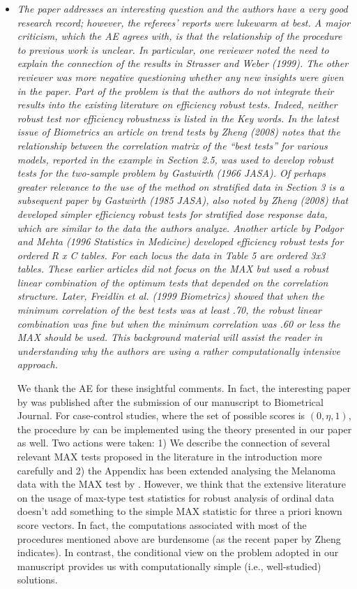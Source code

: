 \documentclass{article}
\begin{document}
\begin{itemize}
\item 
\textit{
The paper addresses an interesting question and the authors have a very good
research record; however, the referees’ reports were lukewarm at best. A major criticism,
which the AE agrees with, is that the relationship of the procedure to previous work is
unclear. In particular, one reviewer noted the need to explain the connection of the results
in Strasser and Weber (1999). The other reviewer was more negative questioning whether
any new insights were given in the paper. Part of the problem is that the authors do not
integrate their results into the existing literature on efficiency robust tests. Indeed, neither
robust test nor efficiency robustness is listed in the Key words. In the latest issue of
Biometrics an article on trend tests by Zheng (2008) notes that the relationship between
the correlation matrix of the “best tests” for various models, reported in the example in
Section 2.5, was used to develop robust tests for the two-sample problem by Gastwirth
(1966 JASA). Of perhaps greater relevance to the use of the method on stratified data in
Section 3 is a subsequent paper by Gastwirth (1985 JASA), also noted by Zheng (2008)
that developed simpler efficiency robust tests for stratified dose response data, which are
similar to the data the authors analyze. Another article by Podgor and Mehta (1996
Statistics in Medicine) developed efficiency robust tests for ordered R x C tables. For
each locus the data in Table 5 are ordered 3x3 tables. These earlier articles did not focus
on the MAX but used a robust linear combination of the optimum tests that depended on
the correlation structure. Later, Freidlin et al. (1999 Biometrics) showed that when the
minimum correlation of the best tests was at least .70, the robust linear combination was
fine but when the minimum correlation was .60 or less the MAX should be used. This
background material will assist the reader in understanding why the authors are using a
rather computationally intensive approach.}

We thank the AE for these insightful comments. In fact, the interesting
paper by \cite{Zheng:2008} was published after the submission of our manuscript
to Biometrical Journal. For case-control studies, where the set of
possible scores is $(0, \eta, 1)$, the procedure by
\cite{Zheng:2003,Zheng:2008}
can be implemented using the theory presented in our paper as well.
Two actions were taken: 1) We describe the connection of several relevant MAX
tests proposed in the literature in the introduction more carefully 
and 2) the Appendix has been extended analysing the Melanoma data with
the MAX test by \cite{Zheng:2008}. However, we think that the extensive literature
on the usage of max-type test statistics for robust analysis of 
ordinal data doesn't add something to the simple MAX statistic for three 
a priori known score vectors. In fact, the computations associated
with most of the procedures mentioned above are burdensome (as the recent
paper by Zheng indicates). In contrast,
the conditional view on the problem adopted in our manuscript provides
us with computationally simple (i.e., well-studied) solutions.


\end{itemize}
\end{document}
